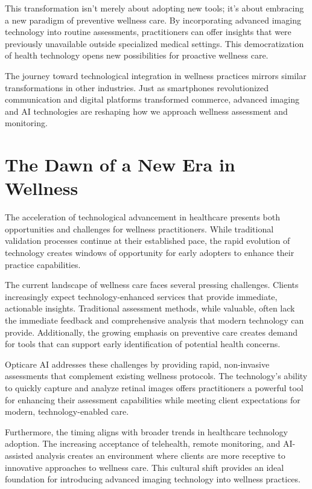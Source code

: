 \documentclass[
  Letterpaper,
]{scrbook}
\begin{document}
This transformation isn't merely about adopting new tools; it's about
embracing a new paradigm of preventive wellness care. By incorporating
advanced imaging technology into routine assessments, practitioners can
offer insights that were previously unavailable outside specialized
medical settings. This democratization of health technology opens new
possibilities for proactive wellness care.

The journey toward technological integration in wellness practices
mirrors similar transformations in other industries. Just as smartphones
revolutionized communication and digital platforms transformed commerce,
advanced imaging and AI technologies are reshaping how we approach
wellness assessment and monitoring.

\section{The Dawn of a New Era in
Wellness}\label{the-dawn-of-a-new-era-in-wellness}

The acceleration of technological advancement in healthcare presents
both opportunities and challenges for wellness practitioners. While
traditional validation processes continue at their established pace, the
rapid evolution of technology creates windows of opportunity for early
adopters to enhance their practice capabilities.

The current landscape of wellness care faces several pressing
challenges. Clients increasingly expect technology-enhanced services
that provide immediate, actionable insights. Traditional assessment
methods, while valuable, often lack the immediate feedback and
comprehensive analysis that modern technology can provide. Additionally,
the growing emphasis on preventive care creates demand for tools that
can support early identification of potential health concerns.

Opticare AI addresses these challenges by providing rapid, non-invasive
assessments that complement existing wellness protocols. The
technology's ability to quickly capture and analyze retinal images
offers practitioners a powerful tool for enhancing their assessment
capabilities while meeting client expectations for modern,
technology-enabled care.

Furthermore, the timing aligns with broader trends in healthcare
technology adoption. The increasing acceptance of telehealth, remote
monitoring, and AI-assisted analysis creates an environment where
clients are more receptive to innovative approaches to wellness care.
This cultural shift provides an ideal foundation for introducing
advanced imaging technology into wellness practices.
\end{document}
